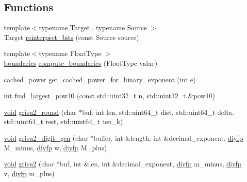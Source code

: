 \subsection*{Functions}
\begin{DoxyCompactItemize}
\item 
{\footnotesize template$<$typename Target , typename Source $>$ }\\Target \hyperlink{namespacenlohmann_1_1detail_1_1dtoa__impl_a1c5d30eb51e5e994a3f48bde104d2ce8}{reinterpret\+\_\+bits} (const Source source)
\item 
{\footnotesize template$<$typename Float\+Type $>$ }\\\hyperlink{structnlohmann_1_1detail_1_1dtoa__impl_1_1boundaries}{boundaries} \hyperlink{namespacenlohmann_1_1detail_1_1dtoa__impl_a22b6e37654ac93c6d0d9c06ec1bf5ded}{compute\+\_\+boundaries} (Float\+Type value)
\item 
\hyperlink{structnlohmann_1_1detail_1_1dtoa__impl_1_1cached__power}{cached\+\_\+power} \hyperlink{namespacenlohmann_1_1detail_1_1dtoa__impl_adbf329a18c5cf854a3477327afd2200b}{get\+\_\+cached\+\_\+power\+\_\+for\+\_\+binary\+\_\+exponent} (int e)
\item 
int \hyperlink{namespacenlohmann_1_1detail_1_1dtoa__impl_a36ded358763b5dbcea9867660fbe4e28}{find\+\_\+largest\+\_\+pow10} (const std\+::uint32\+\_\+t n, std\+::uint32\+\_\+t \&pow10)
\item 
\hyperlink{namespacenlohmann_1_1detail_a59fca69799f6b9e366710cb9043aa77d}{void} \hyperlink{namespacenlohmann_1_1detail_1_1dtoa__impl_a5bc841e0bee12fd6489d49cf7bd07bb4}{grisu2\+\_\+round} (char $\ast$buf, int len, std\+::uint64\+\_\+t dist, std\+::uint64\+\_\+t delta, std\+::uint64\+\_\+t rest, std\+::uint64\+\_\+t ten\+\_\+k)
\item 
\hyperlink{namespacenlohmann_1_1detail_a59fca69799f6b9e366710cb9043aa77d}{void} \hyperlink{namespacenlohmann_1_1detail_1_1dtoa__impl_a9b899c72b0e1e3dd46d75c2b4e6bcdfb}{grisu2\+\_\+digit\+\_\+gen} (char $\ast$buffer, int \&length, int \&decimal\+\_\+exponent, \hyperlink{structnlohmann_1_1detail_1_1dtoa__impl_1_1diyfp}{diyfp} M\+\_\+minus, \hyperlink{structnlohmann_1_1detail_1_1dtoa__impl_1_1diyfp}{diyfp} w, \hyperlink{structnlohmann_1_1detail_1_1dtoa__impl_1_1diyfp}{diyfp} M\+\_\+plus)
\item 
\hyperlink{namespacenlohmann_1_1detail_a59fca69799f6b9e366710cb9043aa77d}{void} \hyperlink{namespacenlohmann_1_1detail_1_1dtoa__impl_a05b681dcb8569b9784c6dccfadb01633}{grisu2} (char $\ast$buf, int \&len, int \&decimal\+\_\+exponent, \hyperlink{structnlohmann_1_1detail_1_1dtoa__impl_1_1diyfp}{diyfp} m\+\_\+minus, \hyperlink{structnlohmann_1_1detail_1_1dtoa__impl_1_1diyfp}{diyfp} v, \hyperlink{structnlohmann_1_1detail_1_1dtoa__impl_1_1diyfp}{diyfp} m\+\_\+plus)

\end{DoxyCompactItemize}
